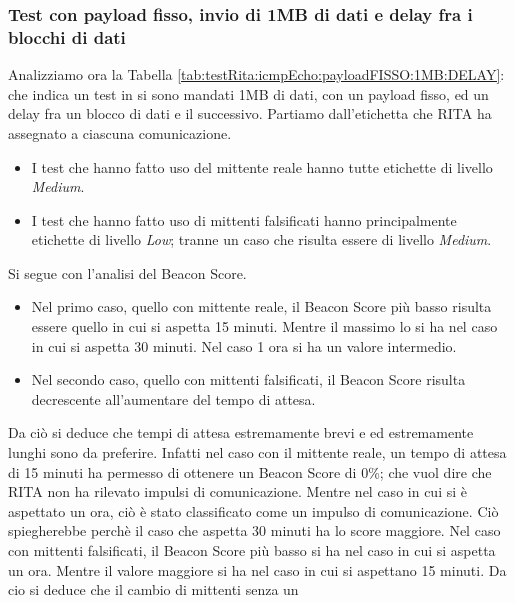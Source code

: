 \subsubsection{Test con payload fisso, invio di 1MB di dati e delay fra i blocchi di dati}  
Analizziamo ora la Tabella \ref{tab:testRita:icmpEcho:payloadFISSO:1MB:DELAY}: 
che indica un test in si sono mandati 1MB di dati, con un payload fisso, 
ed un delay fra un blocco di dati e il successivo.
\vspace{1ex} \newline
Partiamo dall'etichetta che RITA ha assegnato a ciascuna comunicazione.
\begin{itemize} 
    \item[] I test che hanno fatto uso del mittente reale hanno tutte 
    etichette di livello \textit{Medium}. 
    \item[] I test che hanno fatto uso di mittenti falsificati hanno 
    principalmente etichette di livello \textit{Low}; tranne un caso che 
    risulta essere di livello \textit{Medium}.
\end{itemize} 
Si segue con l'analisi del Beacon Score.
\begin{itemize} 
    \item[] Nel primo caso, quello con mittente reale, il Beacon Score 
    più basso risulta essere quello in cui si aspetta 15 minuti. Mentre 
    il massimo lo si ha nel caso in cui si aspetta 30 minuti.
    Nel caso 1 ora si ha un valore intermedio. 
    \item[] Nel secondo caso, quello con mittenti falsificati, il Beacon Score 
    risulta decrescente all'aumentare del tempo di attesa. 
\end{itemize}  
\vspace{2ex} 
Da ciò si deduce che tempi di attesa estremamente brevi e ed estremamente 
lunghi sono da preferire. 
Infatti nel caso con il mittente reale, un tempo di attesa di 15 minuti 
ha permesso di ottenere un Beacon Score di 0\%; che vuol dire che RITA non 
ha rilevato impulsi di comunicazione. Mentre nel caso in cui si è aspettato 
un ora, ciò è stato classificato come un impulso di comunicazione. 
Ciò spiegherebbe perchè il caso che aspetta 30 minuti ha lo score maggiore.
\vspace{2ex} \newline 
Nel caso con mittenti falsificati, il Beacon Score più basso si ha nel caso 
in cui si aspetta un ora. Mentre il valore maggiore si ha nel caso in cui 
si aspettano 15 minuti. Da cio si deduce che il cambio di mittenti senza un 
